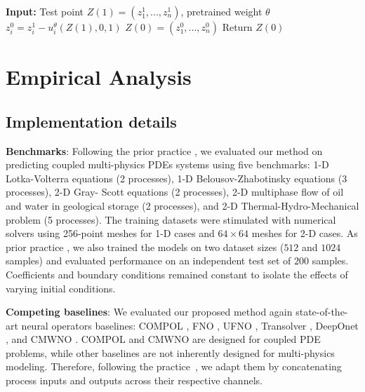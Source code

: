 \documentclass{article}
\begin{document}
\begin{algorithm}
\caption{One-Step Sampling Algorithm}
\label{alg:sampling}
\begin{algorithmic}[1]
\STATE \textbf{Input:} Test point $Z(1) = (z^1_1, ..., z^1_n)$, pretrained weight $\theta$
   \STATE $z^0_i = z^1_i - u^{\theta}_{i}(Z(1),0,1)$
\ENDFOR
\STATE $Z(0) = (z^0_1, ..., z^0_n)$
\STATE Return $Z(0)$
\end{algorithmic}
\end{algorithm}
\section{Empirical Analysis}
\subsection{Implementation details}
\textbf{Benchmarks}:  Following the prior practice \citep{sun2025compolunifiedneuraloperator}, we evaluated our method on predicting coupled multi-physics PDEs systems using five benchmarks: 1-D Lotka-Volterra equations \citep{Murray2002} (2 processes), 1-D Belousov-Zhabotinsky equations \citep{Petrov1993} (3 processes), 2-D Gray-
Scott equations \citep{Pearson_1993} (2 processes), 2-D multiphase flow of oil and water in geological
storage \citep{bear2010modeling} \citep{hashemi2021pore} \cite{aboukassem2013petroleum} (2 processes), and 2-D Thermal-Hydro-Mechanical problem \citep{Gao2020} (5 processes). The training datasets were stimulated with numerical solvers using 256-point meshes for 1-D cases and $64 \times 64$ meshes for 2-D cases. As prior practice \citep{sun2025compolunifiedneuraloperator}, we also trained the models on two dataset sizes ($512$ and $1024$ samples) and evaluated performance on an independent test set of $200$ samples. Coefficients and boundary
conditions remained constant to isolate the effects of varying initial conditions.

\textbf{Competing baselines}: We evaluated our proposed method again state-of-the-art neural operators baselines: COMPOL \citep{sun2025compolunifiedneuraloperator}, FNO \citep{li2021fourier}, UFNO \citep{wen2022ufnoenhancedfourier}, Transolver \citep{wu2024transolverfasttransformersolver}, DeepOnet \citep{lu2021learning}, and CMWNO \citep{xiao2023coupled}. COMPOL and CMWNO are designed for coupled PDE problems, while other baselines are not inherently designed for multi-physics modeling. Therefore, following the practice~\cite{sun2025compolunifiedneuraloperator}, we adapt them by concatenating process inputs and outputs across their respective channels.
\end{document}
